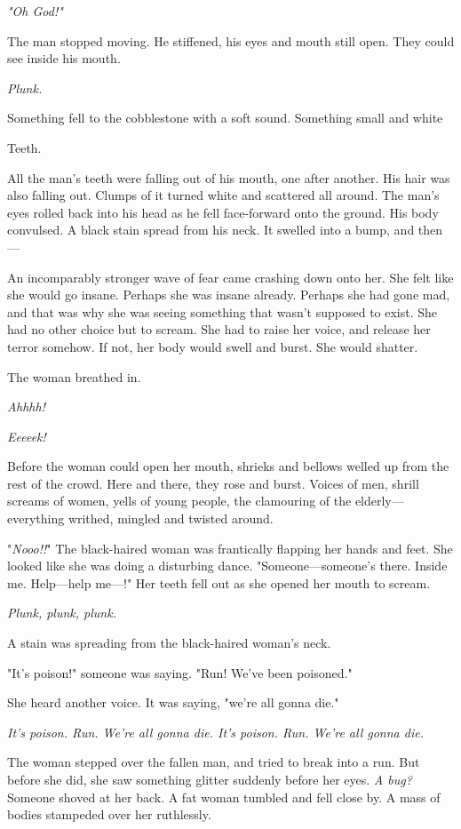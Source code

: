 \emph{"Oh God!"}

The man stopped moving. He stiffened, his eyes and mouth still open.
They could see inside his mouth.

\emph{Plunk.}

Something fell to the cobblestone with a soft sound. Something small and
white\el 

Teeth.

All the man's teeth were falling out of his mouth, one after another.
His hair was also falling out. Clumps of it turned white and scattered
all around. The man's eyes rolled back into his head as he fell
face-forward onto the ground. His body convulsed. A black stain spread
from his neck. It swelled into a bump, and then---

An incomparably stronger wave of fear came crashing down onto her. She
felt like she would go insane. Perhaps she was insane already. Perhaps
she had gone mad, and that was why she was seeing something that wasn't
supposed to exist. She had no other choice but to scream. She had to
raise her voice, and release her terror somehow. If not, her body would
swell and burst. She would shatter.

The woman breathed in.

\emph{Ahhhh!}

\emph{Eeeeek!}

Before the woman could open her mouth, shrieks and bellows welled up
from the rest of the crowd. Here and there, they rose and burst. Voices
of men, shrill screams of women, yells of young people, the clamouring
of the elderly---everything writhed, mingled and twisted around.

"\emph{Nooo!!}" The black-haired woman was frantically flapping her hands and
feet. She looked like she was doing a disturbing dance.
"Someone---someone's there. Inside me. Help---help me---!" Her teeth fell out
as she opened her mouth to scream.

\emph{Plunk, plunk, plunk.}

A stain was spreading from the black-haired woman's neck.

"It's poison!" someone was saying. "Run! We've been poisoned."

She heard another voice. It was saying, "we're all gonna die."

\emph{It's poison. Run. We're all gonna die. It's poison. Run. We're all gonna
die.}

The woman stepped over the fallen man, and tried to break into a run.
But before she did, she saw something glitter suddenly before her eyes.
\emph{A bug?} Someone shoved at her back. A fat woman tumbled and fell close
by. A mass of bodies stampeded over her ruthlessly.


